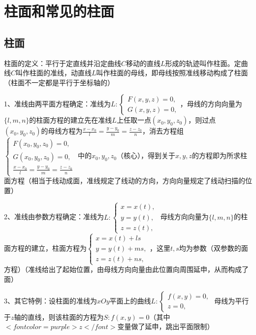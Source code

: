 \section{柱面和常见的柱面}



\subsection{柱面}

柱面的定义：平行于定直线并沿定曲线$ C $移动的直线$ L $形成的轨迹叫作柱面。定曲线$ C $叫作柱面的准线，动直线$ L $叫作柱面的母线，即母线按照准线移动构成了柱面（柱面不一定都是平行于坐标轴的）

1、准线由两平面方程确定：准线为$ L:\left\{\begin{array}{l}F(x, y, z)=0, \\ G(x, y, z)=0,\end{array}\right. $，母线的方向向量为$ \{l, m, n\} $的柱面方程的建立先在准线$ L $上任取一点$ \left(x_{0}, y_{0}, z_{0}\right) $，则过点$ \left(x_{0}, y_{0}, z_{0}\right) $的母线方程为$ \frac{x-x_{0}}{l}=\frac{y-y_{0}}{m}=\frac{z-z_{0}}{n} $，消去方程组$ \left\{\begin{array}{l}F\left(x_{0}, y_{0}, z_{0}\right)=0, \\ G\left(x_{0}, y_{0}, z_{0}\right)=0, \\ \frac{x-x_{0}}{l}=\frac{y-y_{0}}{m}=\frac{z-z_{0}}{n}\end{array}\right. $ 中的$ x_{0}, y_{0}, z_{0} $（核心），得到关于$ x, y, z $的方程即为所求柱面方程（相当于线动成面，准线规定了线动的方向，方向向量规定了线动扫描的位置）

2、准线由参数方程确定：准线为$ L:\left\{\begin{array}{l}x=x(t), \\ y=y(t),  \\ z=z(t), \end{array}\right. $ 母线方向向量为$ \{l, m, n\} $的柱面方程的建立，柱面方程为$ \left\{\begin{array}{l}x=x(t)+l s \\ y=y(t)+m s, \\ z=z(t)+n s,\end{array}\right. $，这里$ t, s $均为参数（双参数的面方程）（准线给出了起始位置，由母线方向向量由此位置向周围延申，从而构成了面）

3、其它特例：设柱面的准线为$ x O y $平面上的曲线$ L:\left\{\begin{array}{l}f(x, y)=0,\\ z=0,\end{array}\right. $ 母线为平行于$ z $轴的直线，则该柱面的方程为$ S: f(x, y)=0 $（其中$ <font color=purple>z</font> $变量做了延申，跳出平面限制）



